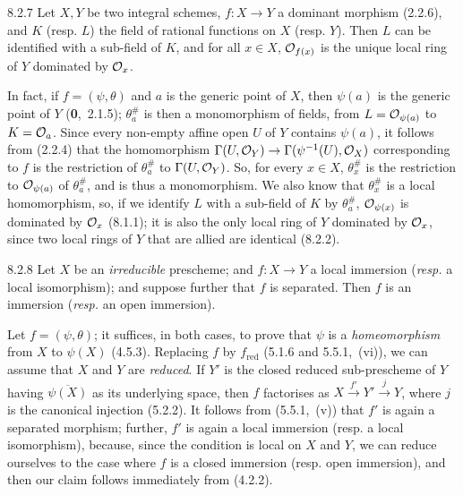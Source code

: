\documentclass[../main.tex]{subfiles}
\begin{document}
\begin{cx}[Proposition]{8.2.7}
    Let $X,Y$ be two integral schemes, $f\colon X\to Y$ a dominant morphism (2.2.6), and $K$ (resp. $L$) the field of rational functions on $X$ (resp. $Y$).
    Then $L$ can be identified with a sub-field of $K$, and for all $x\in X$, $\mathcal{O}_{f(x)}$ is the unique local ring of $Y$ dominated by $\mathcal{O}_x$.
\end{cx}

In fact, if $f=(\psi,\theta)$ and $a$ is the generic point of $X$, then $\psi(a)$ is the generic point of $Y$ (\textbf{0},~2.1.5); $\theta_a^\#$ is then a monomorphism of fields, from $L=\mathcal{O}_{\psi(a)}$ to $K=\mathcal{O}_a$.
Since every non-empty affine open $U$ of $Y$ contains $\psi(a)$, it follows from (2.2.4) that the homomorphism $\Gamma(U,\mathcal{O}_Y)\to\Gamma(\psi^{-1}(U),\mathcal{O}_X)$ corresponding to $f$ is the restriction of $\theta_a^\#$ to $\Gamma(U,\mathcal{O}_Y)$.
So, for every $x\in X$, $\theta_x^\#$ is the restriction to $\mathcal{O}_{\psi(a)}$ of $\theta_a^\#$, and is thus a monomorphism.
We also know that $\theta_x^\#$ is a local homomorphism, so, if we identify $L$ with a sub-field of $K$ by $\theta_a^\#$, $\mathcal{O}_{\psi(x)}$ is dominated by $\mathcal{O}_x$ (8.1.1); it is also the only local ring of $Y$ dominated by $\mathcal{O}_x$, since two local rings of $Y$ that are allied are identical (8.2.2).

\begin{cx}[Proposition]{8.2.8}
    Let $X$ be an \emph{irreducible} prescheme; and $f\colon X\to Y$ a local immersion (\emph{resp.} a local isomorphism); and suppose further that $f$ is separated.
    Then $f$ is an immersion (\emph{resp.} an open immersion).
\end{cx}

Let $f=(\psi,\theta)$; it suffices, in both cases, to prove that $\psi$ is a \emph{homeomorphism} from $X$ to $\psi(X)$ (4.5.3).
Replacing $f$ by $f_\mathrm{red}$ (5.1.6 and 5.5.1,~(vi)), we can assume that $X$ and $Y$ are \emph{reduced}.
If $Y'$ is the closed reduced sub-prescheme of $Y$ having $\overline{\psi(X)}$ as its underlying space, then $f$ factorises as $X\xrightarrow{f'}Y'\xrightarrow{j}Y$, where $j$ is the canonical injection (5.2.2).
It follows from (5.5.1,~(v)) that $f'$ is again a separated morphism; further, $f'$ is again a local immersion (resp. a local isomorphism), because, since the condition is local on $X$ and $Y$, we can reduce ourselves to the case where $f$ is a closed immersion (resp. open immersion), and then our claim follows immediately from (4.2.2).
\end{document}
